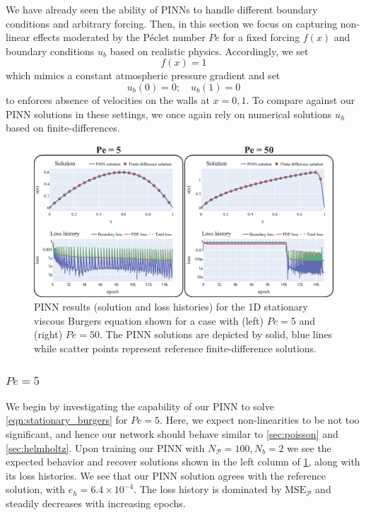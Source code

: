 \documentclass[11pt]{article}
\newcommand{\mse}{\textrm{MSE}}
\newcommand{\pde}{\ensuremath{\mathcal{P}}}
\begin{document}
We have already seen the ability of PINNs to handle different boundary conditions and
arbitrary forcing. Then, in this section we focus on capturing non-linear
effects moderated by the Péclet number \(Pe\) for a fixed forcing \(f(x)\) and boundary
conditions \(u_b\) based on realistic physics. Accordingly, we set
\[ f(x) = 1\]
which mimics a constant atmospheric pressure gradient and set
\[ u_b(0) = 0;\quad  u_b(1) = 0\]
to enforces absence of velocities on the walls at \(x = 0, 1\).
To compare against our PINN solutions in these settings, we once again rely
on numerical solutions \({u}_h\) based on finite-differences.
\begin{figure}[htbp]
\centering
\includegraphics[width=1.0\textwidth]{images/stat_viscous_burgers.eps}
\caption{\label{fig:stat_viscous_burgers_results}PINN results (solution and loss histories) for the 1D stationary viscous Burgers equation shown for a case with (left) \(Pe = 5\) and (right) \(Pe = 50\). The PINN solutions are depicted by solid, blue lines while scatter points represent reference finite-difference solutions.}
\end{figure}

\subsubsection{\(Pe = 5\)}
\label{sec:org5dc6172}
We begin by investigating the capability of our PINN to solve
\cref{eqn:stationary_burgers} for \(Pe = 5\). Here, we expect
non-linearities to be not too significant, and hence our network should behave
similar to \cref{sec:poisson} and
\cref{sec:helmholtz}. Upon training our PINN with \(N_\pde = 100 , N_b = 2\) we
see the expected behavior and recover solutions
shown in the left column of \cref{fig:stat_viscous_burgers_results}, along with its loss
histories. We see that our PINN solution agrees with the reference solution,
with \(e_h = 6.4 \times 10^{-4}\). The loss history is dominated by \(\mse_\pde\) and steadily decreases with increasing epochs.
\end{document}
